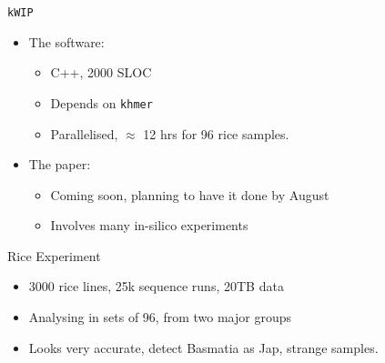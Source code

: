 \documentclass[t]{beamer}
\begin{document}
\begin{frame}{\texttt{kWIP}}
  \begin{itemize}
    \item The software:
      \begin{itemize}
        \item C++, 2000 SLOC
        \item Depends on \texttt{khmer}
        \item Parallelised, $\approx$ 12 hrs for 96 rice samples.
      \end{itemize}
    \pause
    \item The paper:
      \begin{itemize}
        \item Coming soon, planning to have it done by August
        \item Involves many in-silico experiments
      \end{itemize}
  \end{itemize}
\end{frame}


\begin{frame}{Rice Experiment}
  \begin{itemize}
    \item 3000 rice lines, 25k sequence runs, 20TB data
      \pause
    \item Analysing in sets of 96, from two major groups
      \pause
    \item Looks very accurate, detect Basmatia as Jap, strange samples.
  \end{itemize}
\end{frame}
\end{document}
